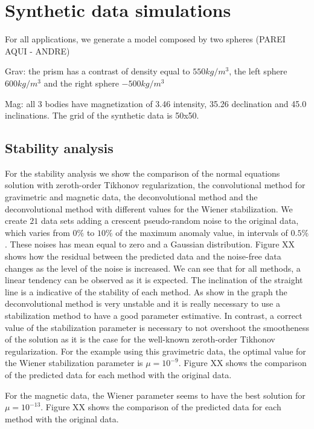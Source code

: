 \section{Synthetic data simulations}
\label{sec:synthetic_simulations}

For all applications, we generate a model composed by two spheres (PAREI AQUI - ANDRE)

Grav: the prism has a contrast of density equal to $550 kg/m^3$, the left sphere $600 kg/m^3$ and the right sphere $-500 kg/m^3$

Mag: all 3 bodies have magnetization of 3.46 intensity, 35.26 declination and 45.0 inclinations.
The grid of the synthetic data is 50x50.


\subsection{Stability analysis}

For the stability analysis we show the comparison of the normal equations solution with zeroth-order Tikhonov regularization, the convolutional method for gravimetric and magnetic data, the deconvolutional method and the deconvolutional method with different values for the Wiener stabilization. We create $21$ data sets adding a crescent pseudo-random noise to the original data, which varies from $0\%$ to $10\%$ of the maximum anomaly value, in intervals of $0.5\%$. These noises has mean equal to zero and a Gaussian distribution.
Figure XX shows how the residual between the predicted data and the noise-free data changes as the level of the noise is increased. We can see that for all methods, a linear tendency can be observed as it is expected. The inclination of the straight line is a indicative of the stability of each method. As show in the graph the deconvolutional method is very unstable and it is really necessary to use a stabilization method to have a good parameter estimative. In contrast, a correct value of the stabilization parameter is necessary to not overshoot the smootheness of the solution as it is the case for the well-known zeroth-order Tikhonov regularization. For the example using this gravimetric data, the optimal value for the Wiener stabilization parameter is $\mu = 10^{-9}$. Figure XX shows the comparison of the predicted data for each method with the original data.

For the magnetic data, the Wiener parameter seems to have the best solution for $\mu = 10^{-13}$. Figure XX shows the comparison of the predicted data for each method with the original data.



